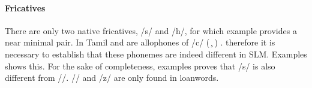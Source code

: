







\paragraph{Fricatives}
There are only two native fricatives, /s/ and /h/, for which example  provides a near minimal pair. In Tamil  and  are allophones of /c/ ( {\btam \c \etam} ) \citep[174]{Suseendirarajah1973phon}.
 therefore it is necessary to establish that these phonemes are indeed different in SLM. Examples  shows this. For the sake of completeness, examples  proves that /s/ is  also different from /\J/. /\sh/ and /z/ are only found in loanwords.\\

